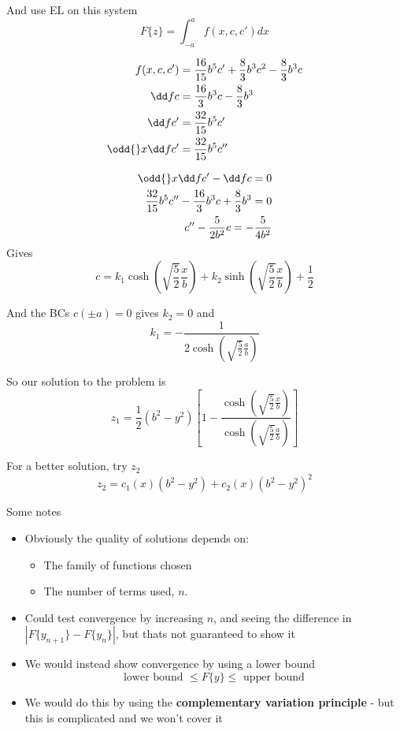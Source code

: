 \documentclass{X:/Documents/Coding/Latex/myassignment}
\begin{document}
And use EL on this system 
\[F\{z\} = \int_{-a}^a f(x,c,c') dx\]

\begin{align*}
	f(x,c,c') &= \frac{16}{15} b^5 c' + \frac83 b^3 c^2 - \frac83 b^3 c\\
	\dd fc &= \frac{16}3 b^3 c - \frac83 b^3\\
	\dd f{c'} &= \frac{32}{15}b^5c'\\
	\odd{}x \dd f{c'} &= \frac{32}{15} b^5 c''
\end{align*}

\begin{align*}
	\odd{}x \dd f{c'} - \dd fc = 0 \\
	\frac{32}{15} b^5 c'' -\frac{16}3 b^3 c + \frac83 b^3 = 0\\
	c'' - \frac{5}{2b^2} c = -\frac{5}{4b^2}
\end{align*}
Gives
\[c = k_1 \cosh\left(\sqrt{\frac52} \frac{x}{b}\right) + k_2 \sinh\left(\sqrt{\frac52} \frac{x}{b}\right) + \frac12\]

And the BCs $c(\pm a) = 0$ gives $k_2 = 0$ and
\[k_1 = -\frac{1}{2\cosh\left(\sqrt{\frac52} \frac ab\right)}\]


So our solution to the problem is
\[z_1 = \frac12 \left(b^2-y^2\right) \left[1 - \frac{\cosh\left(\sqrt{\frac52} \frac{x}{b}\right) }{\cosh\left(\sqrt{\frac52} \frac ab\right)}\right]\]

For a better solution, try $z_2$
\[z_2 = c_1(x)(b^2-y^2) + c_2(x) (b^2-y^2)^2\]


Some notes
\begin{itemize}
	\item Obviously the quality of solutions depends on:
	\begin{itemize}
		\item The family of functions chosen
		\item The number of terms used, $n$.
	\end{itemize}
	\item Could test convergence by increasing $n$, and seeing the difference in $|F\{y_{n+1}\} - F\{y_n\}|$, but thats not guaranteed to show it
	\item We would instead show convergence by using a lower bound
	\[\text{lower bound }\leq F\{y\} \leq \text{ upper bound}\]
	\item We would do this by using the \textbf{complementary variation principle} - but this is complicated and we won't cover it
\end{itemize}
\end{document}
